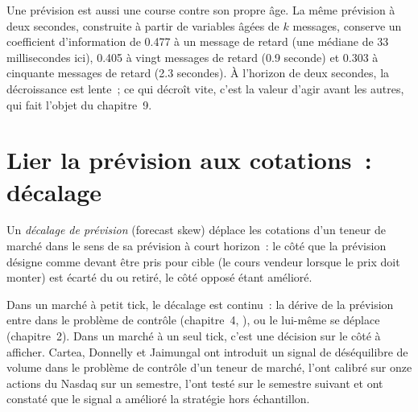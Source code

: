Une prévision est aussi une course contre son propre âge. La même prévision à deux secondes, construite à partir de variables âgées de $k$ messages, conserve un
coefficient d'information de 0.477 à un message de retard (une médiane de 33 millisecondes ici), 0.405 à vingt messages de retard (0.9 seconde) et 0.303 à cinquante messages de retard
(2.3 secondes). À l'horizon de deux secondes, la décroissance est lente~; ce qui décroît vite, c'est la valeur d'agir avant les autres, qui fait l'objet du chapitre~9.

\section{Lier la prévision aux cotations~: décalage}

\begin{definition}\label{def:hf:short-horizon-alpha:skew}
Un \emph{décalage de prévision} (forecast skew) déplace les cotations d'un teneur de marché dans le sens de sa prévision à court horizon~: le côté que la
prévision désigne comme devant être pris pour cible (le cours vendeur lorsque le prix doit monter) est écarté du  ou retiré, le côté opposé étant
amélioré.
\end{definition}

Dans un marché à petit tick, le décalage est continu~: la dérive de la prévision entre dans le problème de contrôle (chapitre~4, ), ou le  lui-même
se déplace (chapitre~2). Dans un marché à un seul tick, c'est une décision sur le côté à afficher. Cartea, Donnelly et Jaimungal ont introduit un signal de déséquilibre de volume
dans le problème de contrôle d'un teneur de marché, l'ont calibré sur onze actions du Nasdaq sur un semestre, l'ont testé sur le semestre suivant et ont constaté que
le signal a amélioré la stratégie hors échantillon.

